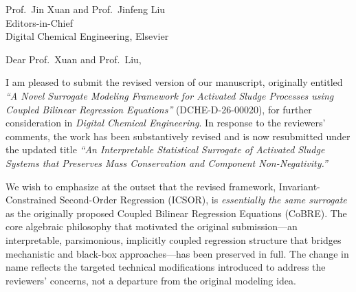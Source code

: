 \documentclass[11pt,a4paper]{letter}
\begin{document}
\begin{letter}{Prof.\ Jin Xuan and Prof.\ Jinfeng Liu \\ Editors-in-Chief \\ Digital Chemical Engineering, Elsevier}

\opening{Dear Prof.\ Xuan and Prof.\ Liu,}

I am pleased to submit the revised version of our manuscript, originally entitled \emph{``A Novel Surrogate Modeling Framework for Activated Sludge Processes using Coupled Bilinear Regression Equations''} (DCHE-D-26-00020), for further consideration in \emph{Digital Chemical Engineering}. In response to the reviewers' comments, the work has been substantively revised and is now resubmitted under the updated title \emph{``An Interpretable Statistical Surrogate of Activated Sludge Systems that Preserves Mass Conservation and Component Non-Negativity.''}

We wish to emphasize at the outset that the revised framework, Invariant-Constrained Second-Order Regression (ICSOR), is \emph{essentially the same surrogate} as the originally proposed Coupled Bilinear Regression Equations (CoBRE). The core algebraic philosophy that motivated the original submission---an interpretable, parsimonious, implicitly coupled regression structure that bridges mechanistic and black-box approaches---has been preserved in full. The change in name reflects the targeted technical modifications introduced to address the reviewers' concerns, not a departure from the original modeling idea.


\end{letter}
\end{document}

